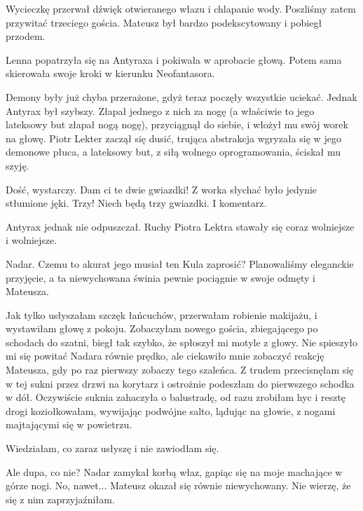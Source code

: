 Wycieczkę przerwał dźwięk otwieranego włazu i chlapanie wody.
Poszliśmy zatem przywitać trzeciego gościa. 
Mateusz był bardzo podekscytowany i pobiegł przodem.

\divider{}

Lenna popatrzyła się na Antyraxa i pokiwała w aprobacie głową.
Potem sama skierowała swoje kroki w kierunku Neofantasora.

Demony były już chyba przerażone, gdyż teraz poczęły wszystkie uciekać.
Jednak Antyrax był szybszy. Złapał jednego z nich za nogę (a właściwie to jego lateksowy but złapał nogą nogę), przyciągnął do siebie, i włożył mu swój worek na głowę.
Piotr Lekter zaczął się dusić, trująca abstrakcja wgryzała się w jego demonowe płuca, a lateksowy but, z siłą wolnego oprogramowania, ściskał mu szyję.

\begin{dialogue}
\ds{} Dość, wystarczy. Dam ci te dwie gwiazdki! \dm{} Z worka słychać było jedynie stłumione jęki. \dm{} Trzy! Niech będą trzy gwiazdki. I komentarz.
\end{dialogue}

Antyrax jednak nie odpuszczał. Ruchy Piotra Lektra stawały się coraz wolniejsze i wolniejsze.

\divider{}

Nadar. Czemu to akurat jego musiał ten Kula zaprosić?
Planowaliśmy eleganckie przyjęcie, a ta niewychowana świnia pewnie pociągnie w swoje odmęty i Mateusza.

Jak tylko usłyszałam szczęk łańcuchów, przerwałam robienie makijażu, i wystawiłam głowę z pokoju.
Zobaczyłam nowego gościa, zbiegającego po schodach do szatni, biegł tak szybko, że spłoszył mi motyle z głowy.
Nie spieszyło mi się powitać Nadara równie prędko, ale ciekawiło mnie zobaczyć reakcję Mateusza, gdy po raz pierwszy zobaczy tego szaleńca.
Z trudem przecisnęłam się w tej sukni przez drzwi na korytarz i ostrożnie podeszłam do pierwszego schodka w dół.
Oczywiście suknia zahaczyła o balustradę, od razu zrobiłam hyc i resztę drogi koziołkowałam, wywijając podwójne salto, lądując na głowie, z nogami majtającymi się w powietrzu.

Wiedziałam, co zaraz usłyszę i nie zawiodłam się.

\begin{dialogue}
\ds{} Ale dupa, co nie? \dm{} Nadar zamykał korbą właz, gapiąc się na moje machające w górze nogi.
\ds{} No, nawet... \dm{} Mateusz okazał się równie niewychowany. Nie wierzę, że się z nim zaprzyjaźniłam.
\end{dialogue}

